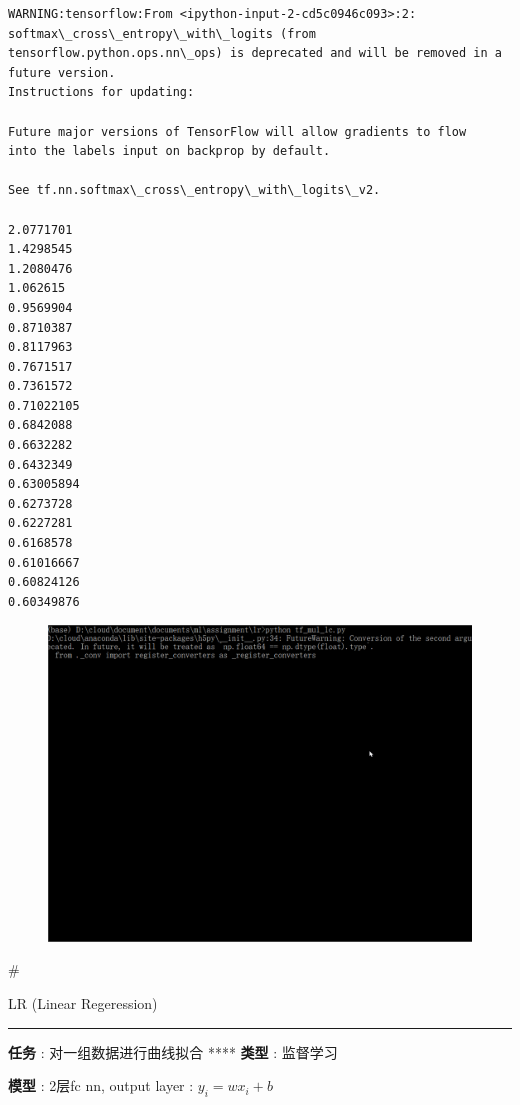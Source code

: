 \documentclass[11pt]{article}
\makeatletter
\def\maxwidth{\ifdim\Gin@nat@width>\linewidth\linewidth
    \else\Gin@nat@width\fi}
\let\Oldincludegraphics\includegraphics
\renewcommand{\includegraphics}[1]{\Oldincludegraphics[width=.8\maxwidth]{#1}}
\makeatother
\begin{document}
    \begin{Verbatim}[commandchars=\\\{\}]
WARNING:tensorflow:From <ipython-input-2-cd5c0946c093>:2: softmax\_cross\_entropy\_with\_logits (from tensorflow.python.ops.nn\_ops) is deprecated and will be removed in a future version.
Instructions for updating:

Future major versions of TensorFlow will allow gradients to flow
into the labels input on backprop by default.

See tf.nn.softmax\_cross\_entropy\_with\_logits\_v2.

2.0771701
1.4298545
1.2080476
1.062615
0.9569904
0.8710387
0.8117963
0.7671517
0.7361572
0.71022105
0.6842088
0.6632282
0.6432349
0.63005894
0.6273728
0.6227281
0.6168578
0.61016667
0.60824126
0.60349876

    \end{Verbatim}

    \begin{figure}
\centering
\includegraphics{assignment/lr/tf_mul_lc.gif}
\caption{}
\end{figure}

    \#

LR (Linear Regeression)

\begin{center}\rule{0.5\linewidth}{\linethickness}\end{center}

\textbf{任务} : 对一组数据进行曲线拟合 **** \textbf{类型} : 监督学习

\textbf{模型} : 2层fc nn, output layer : \({y_i} = w{x_i} + b\)
\end{document}
